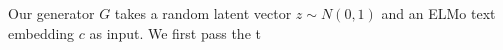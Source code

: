 Our generator $G$ takes a random latent vector $z \sim N(0, 1)$ and an ELMo text embedding $c$ as input. We first pass the t